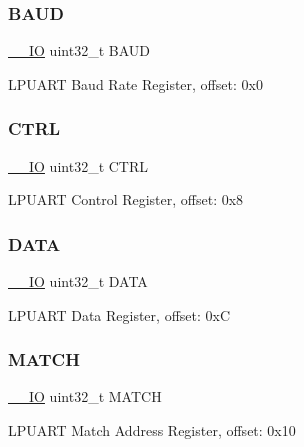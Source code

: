 \subsubsection{\texorpdfstring{BAUD}{BAUD}}
{\footnotesize\ttfamily \mbox{\hyperlink{core__cm0plus_8h_aec43007d9998a0a0e01faede4133d6be}{\+\_\+\+\_\+\+IO}} uint32\+\_\+t B\+A\+UD}

L\+P\+U\+A\+RT Baud Rate Register, offset\+: 0x0 \mbox{\label{struct_l_p_u_a_r_t___type_a15fc8d35f045f329b80c544bef35ff64}} 
\subsubsection{\texorpdfstring{CTRL}{CTRL}}
{\footnotesize\ttfamily \mbox{\hyperlink{core__cm0plus_8h_aec43007d9998a0a0e01faede4133d6be}{\+\_\+\+\_\+\+IO}} uint32\+\_\+t C\+T\+RL}

L\+P\+U\+A\+RT Control Register, offset\+: 0x8 \mbox{\label{struct_l_p_u_a_r_t___type_a54cb6b41986c241ca85af803e9cd6101}} 
\subsubsection{\texorpdfstring{DATA}{DATA}}
{\footnotesize\ttfamily \mbox{\hyperlink{core__cm0plus_8h_aec43007d9998a0a0e01faede4133d6be}{\+\_\+\+\_\+\+IO}} uint32\+\_\+t D\+A\+TA}

L\+P\+U\+A\+RT Data Register, offset\+: 0xC \mbox{\label{struct_l_p_u_a_r_t___type_a04dafd3ac005ff337f83b0a17755161f}} 
\subsubsection{\texorpdfstring{MATCH}{MATCH}}
{\footnotesize\ttfamily \mbox{\hyperlink{core__cm0plus_8h_aec43007d9998a0a0e01faede4133d6be}{\+\_\+\+\_\+\+IO}} uint32\+\_\+t M\+A\+T\+CH}

L\+P\+U\+A\+RT Match Address Register, offset\+: 0x10 \mbox{\label{struct_l_p_u_a_r_t___type_aa90c98b3b95ed1374dbcf018c74aef79}} 
